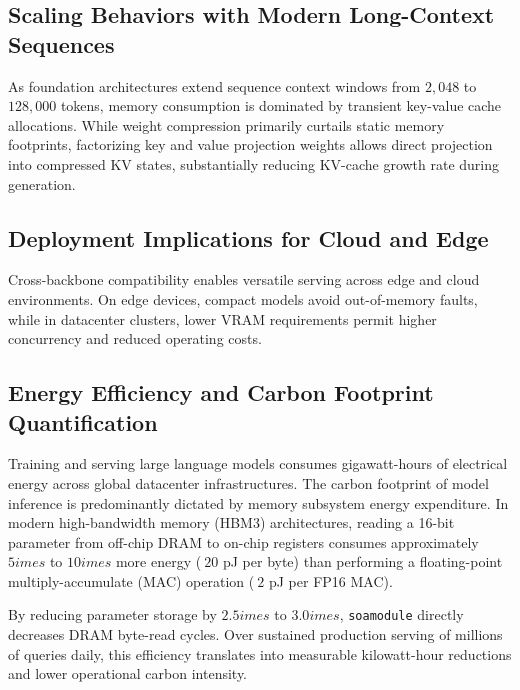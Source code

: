 \subsection{Scaling Behaviors with Modern Long-Context Sequences}
As foundation architectures extend sequence context windows from $2{,}048$ to $128{,}000$ tokens, memory consumption is dominated by transient key-value cache allocations. While weight compression primarily curtails static memory footprints, factorizing key and value projection weights allows direct projection into compressed KV states, substantially reducing KV-cache growth rate during generation.

\subsection{Deployment Implications for Cloud and Edge}
Cross-backbone compatibility enables versatile serving across edge and cloud environments. On edge devices, compact models avoid out-of-memory faults, while in datacenter clusters, lower VRAM requirements permit higher concurrency and reduced operating costs.

\subsection{Energy Efficiency and Carbon Footprint Quantification}
Training and serving large language models consumes gigawatt-hours of electrical energy across global datacenter infrastructures. The carbon footprint of model inference is predominantly dictated by memory subsystem energy expenditure. In modern high-bandwidth memory (HBM3) architectures, reading a 16-bit parameter from off-chip DRAM to on-chip registers consumes approximately $5	imes$ to $10	imes$ more energy ($~20$ pJ per byte) than performing a floating-point multiply-accumulate (MAC) operation ($~2$ pJ per FP16 MAC).

By reducing parameter storage by $2.5	imes$ to $3.0	imes$, \texttt{soamodule} directly decreases DRAM byte-read cycles. Over sustained production serving of millions of queries daily, this efficiency translates into measurable kilowatt-hour reductions and lower operational carbon intensity.
